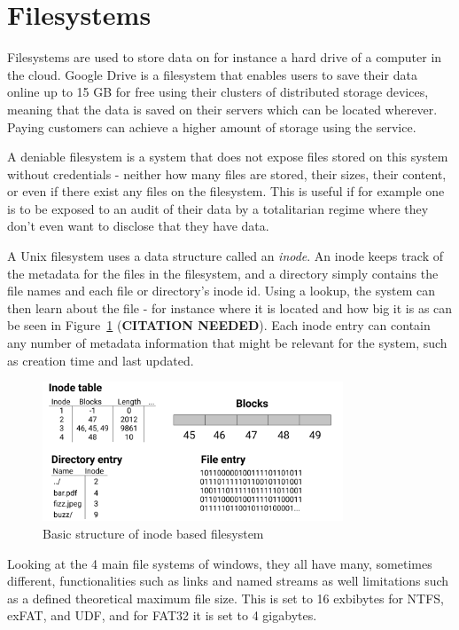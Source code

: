 \section{Filesystems}
Filesystems are used to store data on for instance a hard drive of a computer in the cloud. Google Drive is a filesystem that enables users to save their data online up to 15 GB for free\cite{CloudStorageWork} using their clusters of distributed storage devices, meaning that the data is saved on their servers which can be located wherever\cite{DistributedStorageWhat}. Paying customers can achieve a higher amount of storage using the service.

A deniable filesystem is a system that does not expose files stored on this system without credentials - neither how many files are stored, their sizes, their content, or even if there exist any files on the filesystem\cite{petersDEFYDeniableFile2014}. This is useful if for example one is to be exposed to an audit of their data by a totalitarian regime where they don't even want to disclose that they have data.

A Unix filesystem uses a data structure called an \textit{inode}. An inode keeps track of the metadata for the files in the filesystem, and a directory simply contains the file names and each file or directory's inode id. Using a lookup, the system can then learn about the file - for instance where it is located and how big it is as can be seen in Figure~\ref{fig:inode_diag} (\textbf{CITATION NEEDED}). Each inode entry can contain any number of metadata information that might be relevant for the system, such as creation time and last updated.

\begin{figure}[!ht]
	\begin{center}
	  \includegraphics[width=0.8\textwidth]{figures/inode_diagram.png}
	\end{center}
	\caption{Basic structure of inode based filesystem}
	\label{fig:inode_diag}
\end{figure}

Looking at the 4 main file systems of windows, they all have many, sometimes different, functionalities such as links and named streams as well limitations such as a defined theoretical maximum file size\cite{mikbenFileSystemFunctionality}. This is set to 16 exbibytes for NTFS, exFAT, and UDF, and for FAT32 it is set to 4 gigabytes. 
